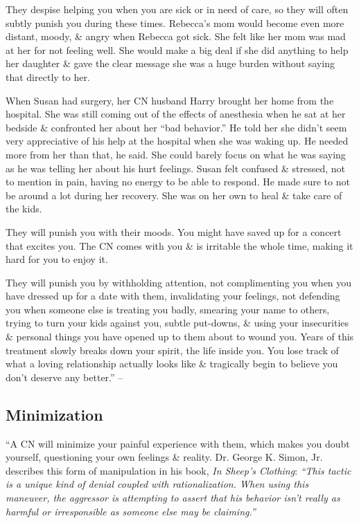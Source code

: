 \documentclass{article}
\numberwithin{equation}{section}
\begin{document}
They despise helping you when you are sick or in need of care, so they will often subtly punish you during these times. Rebecca's mom would become even more distant, moody, \& angry when Rebecca got sick. She felt like her mom was mad at her for not feeling well. She would make a big deal if she did anything to help her daughter \& gave the clear message she was a huge burden without saying that directly to her.

When Susan had surgery, her CN husband Harry brought her home from the hospital. She was still coming out of the effects of anesthesia when he sat at her bedside \& confronted her about her ``bad behavior.'' He told her she didn't seem very appreciative of his help at the hospital when she was waking up. He needed more from her than that, he said. She could barely focus on what he was saying as he was telling her about his hurt feelings. Susan felt confused \& stressed, not to mention in pain, having no energy to be able to respond. He made sure to not be around a lot during her recovery. She was on her own to heal \& take care of the kids.

They will punish you with their moods. You might have saved up for a concert that excites you. The CN comes with you \& is irritable the whole time, making it hard for you to enjoy it.

They will punish you by withholding attention, not complimenting you when you have dressed up for a date with them, invalidating your feelings, not defending you when someone else is treating you badly, smearing your name to others, trying to turn your kids against you, subtle put-downs, \& using your insecurities \& personal things you have opened up to them about to wound you. Years of this treatment slowly breaks down your spirit, the life inside you. You lose track of what a loving relationship actually looks like \& tragically begin to believe you don't deserve any better.'' -- \cite[pp. 87--88]{Mirza2017}

\subsection{Minimization}
``A CN will minimize your painful experience with them, which makes you doubt yourself, questioning your own feelings \& reality. Dr. George K. Simon, Jr. describes this form of manipulation in his book, \textit{In Sheep's Clothing}: \textit{``This tactic is a unique kind of denial coupled with rationalization. When using this maneuver, the aggressor is attempting to assert that his behavior isn't really as harmful or irresponsible as someone else may be claiming.''}
\end{document}
